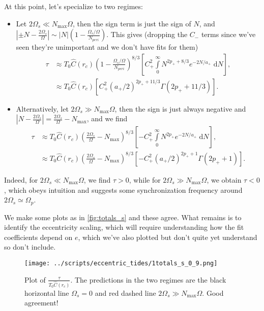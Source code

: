 \documentclass[11pt,
        usenames, %
        dvipsnames %
    ]{article}
\newcommand*{\abs}[1]{\left|#1\right|}
\newcommand*{\p}[1]{\left(#1\right)}
\newcommand*{\s}[1]{\left[#1\right]}
\begin{document}
At this point, let's specialize to two regimes:
\begin{itemize}
    \item Let $2\Omega_s \ll N_{\max} \Omega$, then the sign term is just the
        sign of $N$, and $\abs{\pm N - \frac{2\Omega_s}{\Omega}} \sim
        \abs{N}\p{1 - \frac{\Omega_s/\Omega}{N_{peri}}}$. This gives
        (dropping the $C_-$ terms since we've seen they're unimportant and we
        don't have fits for them)
        \begin{align}
            \tau &\approx T_0 \hat{C}(r_c)
                \p{1 - \frac{\Omega_s/\Omega}{N_{peri}}}^{8/3}
            \s{
                C_+^2\int\limits_0^{\infty}
                    N^{2p_+ + 8/3}e^{-2N/a_+}\;\mathrm{d}N},\\
                &\approx T_0\hat{C}(r_c)\s{
                    C_+^2 (a_+/2)^{2p_+ + 11/3} \Gamma\p{2p_+ + 11/3}}.
        \end{align}

    \item Alternatively, let $2\Omega_s \gg N_{\max}\Omega$, then the sign is
        just always negative and $\abs{N - \frac{2\Omega_s}{\Omega}} =
        \frac{2\Omega_s}{\Omega} - N_{\max}$, and we find
        \begin{align}
            \tau &\approx T_0 \hat{C}(r_c) \p{\frac{2\Omega_s}{\Omega} -
                    N_{\max}}^{8/3}
                \s{-C_+^2\int\limits_0^{\infty}
                    N^{2p_+}e^{-2N/a_+}\;\mathrm{d}N},\\
                &\approx T_0\hat{C}(r_c)
                    \p{\frac{2\Omega_s}{\Omega} - N_{\max}}^{8/3}\s{
                        -C_+^2 (a_+/2)^{2p_+ + 1} \Gamma\p{2p_+ + 1}}.
        \end{align}
\end{itemize}
Indeed, for $2\Omega_s \ll N_{\max}\Omega$, we find $\tau > 0$, while for
$2\Omega_s \gg N_{\max} \Omega$, we obtain $\tau < 0$, which obeys intuition and
suggests some synchronization frequency around $2\Omega_s \simeq \Omega_p$.

We make some plots as in \autoref{fig:totals_s} and these agree. What remains is
to identify the eccentricity scaling, which will require understanding how the
fit coefficients depend on $e$, which we've also plotted but don't quite yet
understand so don't include.
\begin{figure}[t]
    \centering
    \texttt{[image: ../scripts/eccentric\_tides/1totals\_s\_0\_9.png]}
    \caption{Plot of $\frac{\tau}{T_0 \hat{C}(r_c)}$. The predictions in the two
    regimes are the black horizontal line $\Omega_s = 0$ and red dashed line
    $2\Omega_s \gg N_{\max}\Omega$. Good agreement!}\label{fig:totals_s}
\end{figure}
\end{document}
